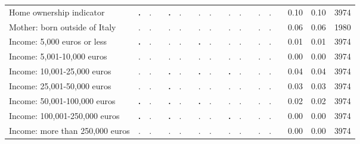 \begin{tabular}{l c c c c c c c c c c c c c c c c c c}
Home ownership indicator & \textbf{        .} &         . & & \textbf{        .} &         . & &         . &         . & &         . &         . & &         . &         . & &      0.10 &      0.10 &      3974 \\
Mother: born outside of Italy &         . &         . & &         . &         . & &         . &         . & &         . &         . & &         . &         . & &      0.06 &      0.06 &      1980 \\
Income: 5,000 euros or less & \textbf{        .} &         . & &         . &         . & & \textbf{        .} &         . & &         . &         . & &         . &         . & &      0.01 &      0.01 &      3974 \\
Income: 5,001-10,000 euros &         . &         . & &         . &         . & &         . &         . & &         . &         . & &         . &         . & &      0.00 &      0.00 &      3974 \\
Income: 10,001-25,000 euros &         . &         . & & \textbf{        .} &         . & & \textbf{        .} &         . & & \textbf{        .} &         . & &         . &         . & &      0.04 &      0.04 &      3974 \\
Income: 25,001-50,000 euros &         . &         . & & \textbf{        .} &         . & &         . &         . & &         . &         . & &         . &         . & &      0.03 &      0.03 &      3974 \\
Income: 50,001-100,000 euros & \textbf{        .} &         . & & \textbf{        .} &         . & & \textbf{        .} &         . & &         . &         . & &         . &         . & &      0.02 &      0.02 &      3974 \\
Income: 100,001-250,000 euros & \textbf{        .} &         . & & \textbf{        .} &         . & &         . &         . & & \textbf{        .} &         . & &         . &         . & &      0.00 &      0.00 &      3974 \\
Income: more than 250,000 euros &         . &         . & &         . &         . & &         . &         . & &         . &         . & &         . &         . & &      0.00 &      0.00 &      3974 \\
\bottomrule
\end{tabular}
